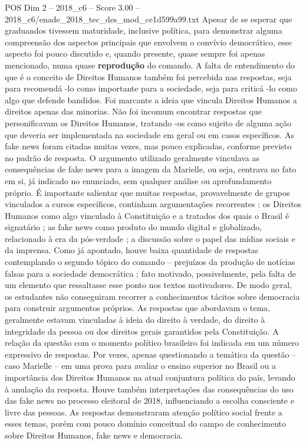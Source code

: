\begin{textsample}{POS Dim 2 – 2018\_c6 – Score 3.00 – 2018\_c6/enade\_2018\_tec\_des\_mod\_ce1d599a99.txt}
Apesar de se esperar que graduandos tivessem maturidade, inclusive política, para demonstrar alguma compreensão dos aspectos principais que envolvem o convívio democrático, esse aspecto foi pouco discutido e, quando presente, quase sempre foi apenas mencionado, numa quase \textbf{reprodução} do comando.
A falta de entendimento do que é o conceito de Direitos Humanos também foi percebida nas respostas, seja para recomendá -lo como importante para a sociedade, seja para criticá -lo como algo que defende bandidos.
Foi marcante a ideia que vincula Direitos Humanos a direitos apenas das minorias.
Não foi incomum encontrar respostas que personificavam os Direitos Humanos, tratando -os como sujeito de alguma ação que deveria ser implementada na sociedade em geral ou em casos específicos.
As fake news foram citadas muitas vezes, mas pouco explicadas, conforme previsto no padrão de resposta.
O argumento utilizado geralmente vinculava as consequências de fake news para a imagem da Marielle, ou seja, centrava no fato em si, já indicado no enunciado, sem qualquer análise ou aprofundamento próprio.
É importante salientar que muitas respostas, provavelmente de grupos vinculados a cursos específicos, continham argumentações recorrentes : os Direitos Humanos como algo vinculado à Constituição e a tratados dos quais o Brasil é signatário ; as fake news como produto do mundo digital e globalizado, relacionado à era da pós-verdade ; a discussão sobre o papel das mídias sociais e da imprensa.
Como já apontado, houve baixa quantidade de respostas contemplando o segundo tópico do comando – prejuízos da produção de notícias falsas para a sociedade democrática ; fato motivado, possivelmente, pela falta de um elemento que ressaltasse esse ponto nos textos motivadores.
De modo geral, os estudantes não conseguiram recorrer a conhecimentos tácitos sobre democracia para construir argumentos próprios.
As respostas que abordavam o tema, geralmente estavam vinculadas à ideia do direito à verdade, do direito à integridade da pessoa ou dos direitos gerais garantidos pela Constituição.
A relação da questão com o momento político brasileiro foi indicada em um número expressivo de respostas.
Por vezes, apenas questionando a temática da questão – caso Marielle – em uma prova para avaliar o ensino superior no Brasil ou a importância dos Direitos Humanos na atual conjuntura política do país, levando à anulação da resposta.
Houve também interpretações das consequências do uso das fake news no processo eleitoral de 2018, influenciando a escolha consciente e livre das pessoas.
As respostas demonstraram atenção político social frente a esses temas, porém com pouco domínio conceitual do campo de conhecimento sobre Direitos Humanos, fake news e democracia.

\end{textsample}
